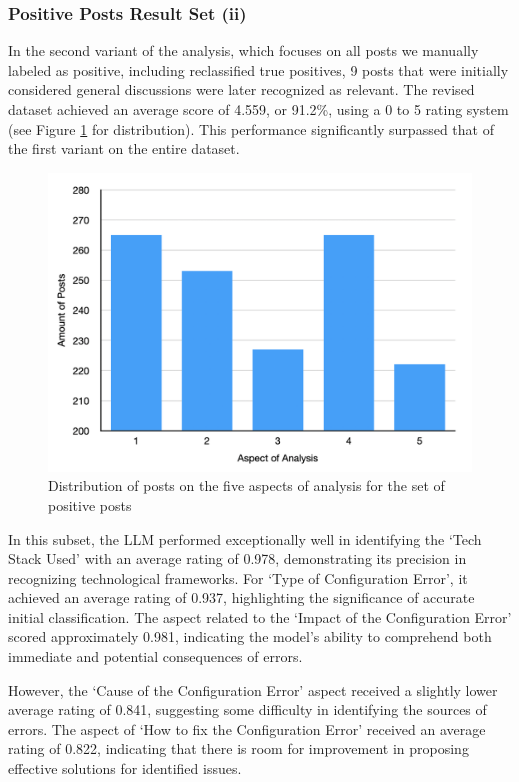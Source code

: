 \documentclass[english,bachelor]{swsLeipzig}
\begin{document}
\subsubsection{Positive Posts Result Set (ii)}

In the second variant of the analysis, which focuses on all posts we manually labeled as positive, including reclassified true positives, 9 posts that were initially considered general discussions were later recognized as relevant. The revised dataset achieved an average score of 4.559, or 91.2\%, using a 0 to 5 rating system (see Figure 
\ref{fig:appendix4} for distribution). This performance significantly surpassed that of the first variant on the entire dataset.

\begin{figure}[h]
  \centering
  \includegraphics[width=1\textwidth]{images/table_setB.png}
  \caption{Distribution of posts on the five aspects of analysis for the set of positive posts}
  \label{fig:appendix4}
\end{figure}

In this subset, the LLM performed exceptionally well in identifying the `Tech Stack Used' with an average rating of 0.978, demonstrating its precision in recognizing technological frameworks. For `Type of Configuration Error', it achieved an average rating of 0.937, highlighting the significance of accurate initial classification. The aspect related to the `Impact of the Configuration Error' scored approximately 0.981, indicating the model's ability to comprehend both immediate and potential consequences of errors.

However, the `Cause of the Configuration Error' aspect received a slightly lower average rating of 0.841, suggesting some difficulty in identifying the sources of errors. The aspect of `How to fix the Configuration Error' received an average rating of 0.822, indicating that there is room for improvement in proposing effective solutions for identified issues.
\end{document}
